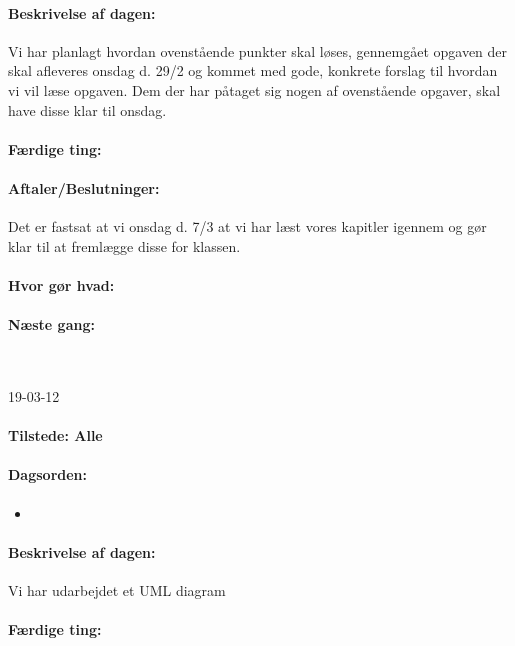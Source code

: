 \documentclass[a4paper,10pt,titlepage]{article}
\begin{document}
		\paragraph{Beskrivelse af dagen:}
		Vi har planlagt hvordan ovenst\aa ende punkter skal l\o ses, gennemg\aa et opgaven der skal afleveres onsdag d. 29/2 og kommet med gode, konkrete forslag til hvordan vi vil l\ae se opgaven.
Dem der har p\aa taget sig nogen af ovenst\aa ende opgaver, skal have disse klar til onsdag.

		\paragraph{F\ae rdige ting:}
		
		\paragraph{Aftaler/Beslutninger:}
		Det er fastsat at vi onsdag d. 7/3 at vi har l\ae st vores kapitler igennem og g\o r klar til at freml\ae gge disse for klassen.
		\paragraph{Hvor g\o r hvad:}
		
		\paragraph{N\ae ste gang:}\mbox{}\\
		
		\begin{center}
		19-03-12
		\end{center}
		
		\paragraph{Tilstede: Alle}
		\paragraph{Dagsorden:}
		\begin{itemize}
					\item 
		\end{itemize}
		
		\paragraph{Beskrivelse af dagen:}
		Vi har udarbejdet et UML diagram
		\paragraph{F\ae rdige ting:}
		
\end{document}

